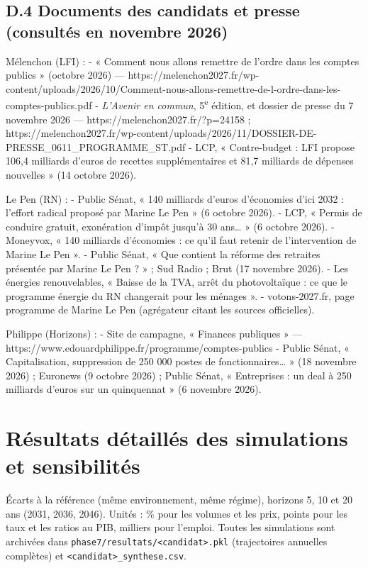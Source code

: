 \documentclass[
  11pt,
  11pt,
  a4paper,
  openany]{book}
\begin{document}
\hypertarget{d.4-documents-des-candidats-et-presse-consultuxe9s-en-novembre-2026}{%
\section{D.4 Documents des candidats et presse (consultés en novembre
2026)}\label{d.4-documents-des-candidats-et-presse-consultuxe9s-en-novembre-2026}}

Mélenchon (LFI) : - « Comment nous allons remettre de l'ordre dans les
comptes publics » (octobre 2026) ---
https://melenchon2027.fr/wp-content/uploads/2026/10/Comment-nous-allons-remettre-de-l-ordre-dans-les-comptes-publics.pdf
- \emph{L'Avenir en commun}, 5\textsuperscript{e} édition, et dossier de
presse du 7 novembre 2026 --- https://melenchon2027.fr/?p=24158 ;
https://melenchon2027.fr/wp-content/uploads/2026/11/DOSSIER-DE-PRESSE\_0611\_PROGRAMME\_ST.pdf
- LCP, « Contre-budget : LFI propose 106,4 milliards d'euros de recettes
supplémentaires et 81,7 milliards de dépenses nouvelles » (14 octobre
2026).

Le Pen (RN) : - Public Sénat, « 140 milliards d'euros d'économies d'ici
2032 : l'effort radical proposé par Marine Le Pen » (6 octobre 2026). -
LCP, « Permis de conduire gratuit, exonération d'impôt jusqu'à 30
ans\ldots{} » (6 octobre 2026). - Moneyvox, « 140 milliards d'économies
: ce qu'il faut retenir de l'intervention de Marine Le Pen ». - Public
Sénat, « Que contient la réforme des retraites présentée par Marine Le
Pen ? » ; Sud Radio ; Brut (17 novembre 2026). - Les énergies
renouvelables, « Baisse de la TVA, arrêt du photovoltaïque : ce que le
programme énergie du RN changerait pour les ménages ». - votons-2027.fr,
page programme de Marine Le Pen (agrégateur citant les sources
officielles).

Philippe (Horizons) : - Site de campagne, « Finances publiques » ---
https://www.edouardphilippe.fr/programme/comptes-publics - Public Sénat,
« Capitalisation, suppression de 250 000 postes de
fonctionnaires\ldots{} » (18 novembre 2026) ; Euronews (9 octobre 2026)
; Public Sénat, « Entreprises : un deal à 250 milliards d'euros sur un
quinquennat » (6 novembre 2026).

\hypertarget{sec:annexe-e}{%
\chapter{Résultats détaillés des simulations et
sensibilités}\label{sec:annexe-e}}

Écarts à la référence (même environnement, même régime), horizons 5, 10
et 20 ans (2031, 2036, 2046). Unités : \% pour les volumes et les prix,
points pour les taux et les ratios au PIB, milliers pour l'emploi.
Toutes les simulations sont archivées dans
\texttt{phase7/resultats/\textless{}candidat\textgreater{}.pkl}
(trajectoires annuelles complètes) et
\texttt{\textless{}candidat\textgreater{}\_synthese.csv}.
\end{document}
